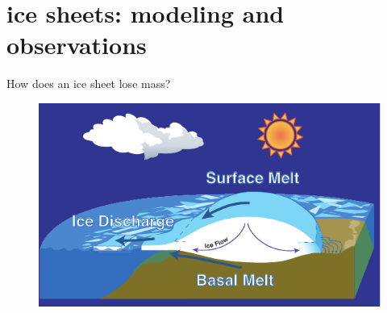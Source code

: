 \documentclass[intlimits]{beamer}
\begin{document}
{
%
} 


\section[modeling and observations]{ice sheets: modeling and observations}

\begin{frame}{How does an ice sheet lose mass?}
  \begin{figure}
    \includegraphics[width=\textwidth]{ice-sheet-cartoon}\\
  \end{figure}
\end{frame}
\end{document}
